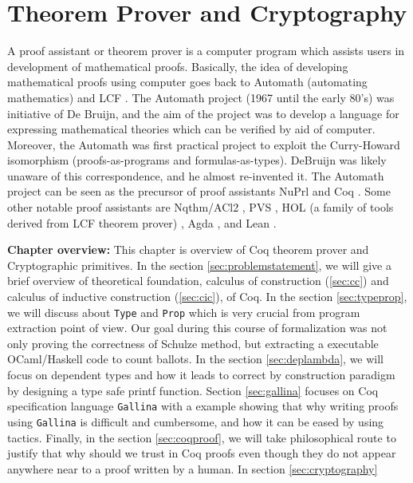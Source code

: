 \chapter{Theorem Prover and Cryptography}
\label{cha:theorem_crypto}
 

A proof assistant or theorem prover is a computer program which assists users in development 
of mathematical proofs. Basically, the idea of 
developing mathematical proofs using computer goes back to Automath (automating mathematics)
\citep{deBruijn1983} and LCF \citep{Milner:1972:IAS:942578.807067}. The 
Automath project (1967 until the early 80's)  was initiative of De Bruijn, and the aim of the project was to 
develop a language for expressing mathematical theories which can be verified by aid of computer.  
Moreover, the Automath was first 
practical project to exploit the Curry-Howard isomorphism (proofs-as-programs and formulas-as-types). 
DeBruijn  was likely unaware of this correspondence, and he almost re-invented it.
The Automath project can be seen as the precursor of
 proof assistants NuPrl \citep{Constable:1986:IMN:10510} and Coq \citep{Bertot:2004:ITP}.  
 Some other notable  proof assistants are 
 Nqthm/ACl2 \citep{507872}, PVS \citep{Owre:1992:PPV:648230.752639},
 HOL (a family of tools derived from LCF theorem prover) \citep{Slind:2008:BOH:1459784.1459792}
 \citep{Harrison:1996:HLT:646184.682934} \citep{Nipkow:2002:IHP},
 Agda \citep{Norell:2008:DTP:1813347.1813352}, and Lean \citep{10.1007/978-3-319-21401-6_26}.


\textbf{Chapter overview:}
 This chapter is overview of Coq theorem prover and Cryptographic primitives. 
 In the section \ref{sec:problemstatement}, we will give a brief overview of 
 theoretical foundation, calculus of construction (\ref{sec:cc}) and calculus of inductive 
 construction (\ref{sec:cic}), of Coq.  In the section \ref{sec:typeprop}, we will discuss about 
 \texttt{Type} and \texttt{Prop}
 which is very crucial from program extraction point of view.  Our goal during 
 this course of formalization was not only proving the correctness of 
 Schulze method, but extracting a executable OCaml/Haskell code to count 
 ballots.  In the section \ref{sec:deplambda}, we will focus 
 on dependent types and  how it leads to correct by construction paradigm
 by designing a  type safe printf function. 
 Section \ref{sec:gallina} focuses on Coq specification language 
 \texttt{Gallina} with a example showing that why writing proofs using  
 \texttt{Gallina} is difficult and cumbersome, and how it can be eased by 
 using tactics. Finally, in the section  \ref{sec:coqproof}, we will take 
 philosophical route to justify that why should we trust in Coq proofs 
 even though they do not appear anywhere near to a proof written by 
 a human.  In section \ref{sec:cryptography}


